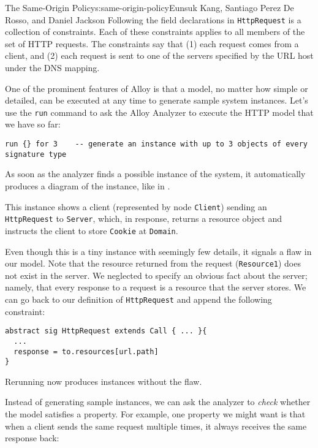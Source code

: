 \begin{aosachapter}{The Same-Origin Policy}{s:same-origin-policy}{Eunsuk Kang, Santiago Perez De Rosso, and Daniel Jackson}
Following the field declarations in \texttt{HttpRequest} is a collection
of constraints. Each of these constraints applies to all members of the
set of HTTP requests. The constraints say that (1) each request comes
from a client, and (2) each request is sent to one of the servers
specified by the URL host under the DNS mapping.

One of the prominent features of Alloy is that a model, no matter how
simple or detailed, can be executed at any time to generate sample
system instances. Let's use the \texttt{run} command to ask the Alloy
Analyzer to execute the HTTP model that we have so far:

\begin{verbatim}
run {} for 3    -- generate an instance with up to 3 objects of every signature type
\end{verbatim}

As soon as the analyzer finds a possible instance of the system, it
automatically produces a diagram of the instance, like in
.


This instance shows a client (represented by node \texttt{Client})
sending an \texttt{HttpRequest} to \texttt{Server}, which, in response,
returns a resource object and instructs the client to store
\texttt{Cookie} at \texttt{Domain}.

Even though this is a tiny instance with seemingly few details, it
signals a flaw in our model. Note that the resource returned from the
request (\texttt{Resource1}) does not exist in the server. We neglected
to specify an obvious fact about the server; namely, that every response
to a request is a resource that the server stores. We can go back to our
definition of \texttt{HttpRequest} and append the following constraint:

\begin{verbatim}
abstract sig HttpRequest extends Call { ... }{
  ...
  response = to.resources[url.path]
}
\end{verbatim}

Rerunning now produces instances without the flaw.

Instead of generating sample instances, we can ask the analyzer to
\emph{check} whether the model satisfies a property. For example, one
property we might want is that when a client sends the same request
multiple times, it always receives the same response back:


\end{aosachapter}
